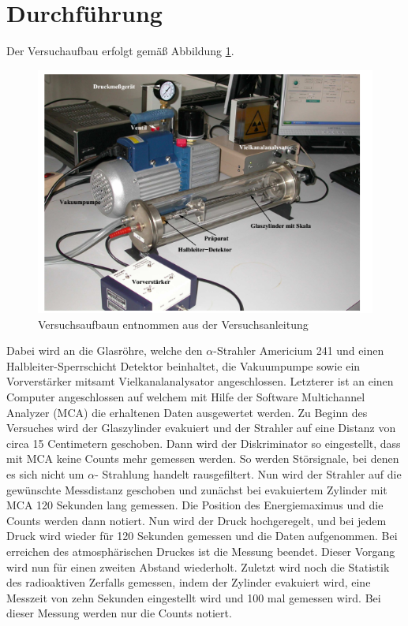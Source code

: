 \section{Durchführung}
\label{sec:Durchführung}
Der Versuchaufbau erfolgt gemäß Abbildung \ref{fig:aufbau}.
\begin{figure}
  \centering
  \includegraphics{images/aufbau.png}
  \caption{Versuchsaufbaun entnommen aus der Versuchsanleitung \cite{1}}
  \label{fig:aufbau}
\end{figure}
Dabei wird an die Glasröhre, welche den $\alpha$-Strahler Americium 241 und einen Halbleiter-Sperrschicht Detektor beinhaltet, die Vakuumpumpe sowie ein Vorverstärker mitsamt Vielkanalanalysator angeschlossen.
Letzterer ist an einen Computer angeschlossen auf welchem mit Hilfe der Software Multichannel Analyzer (MCA) die erhaltenen Daten ausgewertet werden.
Zu Beginn des Versuches wird der Glaszylinder evakuiert und der Strahler auf eine Distanz von circa 15 Centimetern geschoben.
Dann wird der Diskriminator so eingestellt, dass mit MCA keine Counts mehr gemessen werden. So werden Störsignale, bei denen es sich nicht um $\alpha$- Strahlung handelt
rausgefiltert. Nun wird der Strahler auf die gewünschte Messdistanz geschoben und zunächst bei evakuiertem Zylinder mit MCA 120 Sekunden lang gemessen. Die Position des
Energiemaximus und die Counts werden dann notiert. Nun wird der Druck hochgeregelt, und bei jedem Druck wird wieder für 120 Sekunden gemessen und die Daten aufgenommen.
Bei erreichen des atmosphärischen Druckes ist die Messung beendet. Dieser Vorgang wird nun für einen zweiten Abstand wiederholt.
Zuletzt wird noch die Statistik des radioaktiven Zerfalls gemessen, indem der Zylinder evakuiert wird, eine Messzeit von zehn Sekunden eingestellt wird und 100 mal gemessen wird.
Bei dieser Messung werden nur die Counts notiert.

